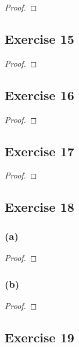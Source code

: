 \documentclass[14pt]{extarticle}
\begin{document}
\begin{proof}

\end{proof}

\subsection{Exercise 15}

\begin{proof}

\end{proof}

\subsection{Exercise 16}

\begin{proof}

\end{proof}

\subsection{Exercise 17}

\begin{proof}

\end{proof}

\subsection{Exercise 18}

\subsubsection{(a)}

\begin{proof}

\end{proof}

\subsubsection{(b)}

\begin{proof}

\end{proof}

\subsection{Exercise 19}
\end{document}
